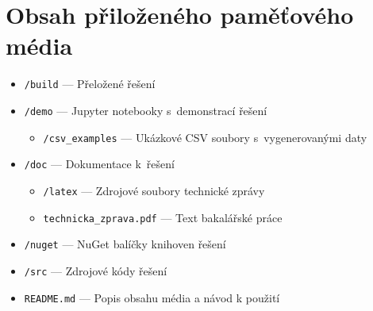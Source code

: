 \chapter{Obsah přiloženého paměťového média}
\label{priloha-E}

\begin{itemize}
  \item \texttt{/build} --- Přeložené řešení
  \item \texttt{/demo} --- Jupyter notebooky s~demonstrací řešení
    \begin{itemize}
        \item \texttt{/csv\_examples} --- Ukázkové CSV soubory s~vygenerovanými daty
    \end{itemize}
  \item \texttt{/doc} --- Dokumentace k~řešení
    \begin{itemize}
        \item \texttt{/latex} --- Zdrojové soubory technické zprávy
        \item \texttt{technicka\_zprava.pdf} --- Text bakalářské práce
    \end{itemize}
  \item \texttt{/nuget} --- NuGet balíčky knihoven řešení
  \item \texttt{/src} --- Zdrojové kódy řešení
  \item \texttt{README.md} --- Popis obsahu média a návod k použití
\end{itemize}
